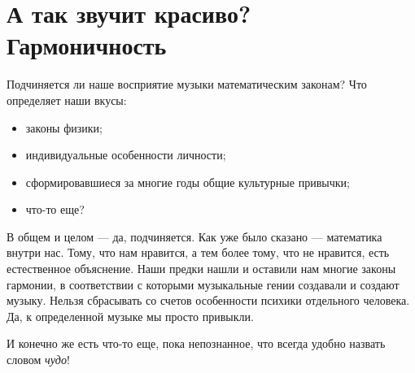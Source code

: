 \chapter{А так звучит красиво? Гармоничность}
\label{ch:harmony}


Подчиняется ли наше восприятие музыки математическим законам? Что определяет наши вкусы:
\begin{itemize}
    \item законы физики;
    \item индивидуальные особенности личности;
    \item сформировавшиеся за многие годы общие культурные привычки;
    \item что-то еще?
\end{itemize}

В общем и целом --- да, подчиняется. Как уже было сказано --- математика внутри нас. Тому, что нам нравится, а тем более тому, что не нравится, есть естественное объяснение. Наши предки нашли и оставили нам многие законы гармонии, в соответствии с которыми музыкальные гении создавали и создают музыку. Нельзя сбрасывать со счетов особенности психики отдельного человека. Да, к определенной музыке мы просто привыкли.

И конечно же есть что-то еще, пока непознанное, что всегда удобно назвать словом \emph{чудо}!







